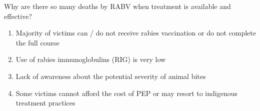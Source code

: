 \documentclass{notes}
\begin{document}
Why are there so many deaths by RABV when treatment is available and effective?

\begin{enumerate}
    \item Majority of victims can / do not receive rabies vaccination or do not complete the full course
    \item Use of rabies immunoglobulins (RIG) is very low
    \item Lack of awareness about the potential severity of animal bites
    \item Some victims cannot afford the cost of PEP or may resort to indigenous treatment practices
\end{enumerate}
\end{document}
